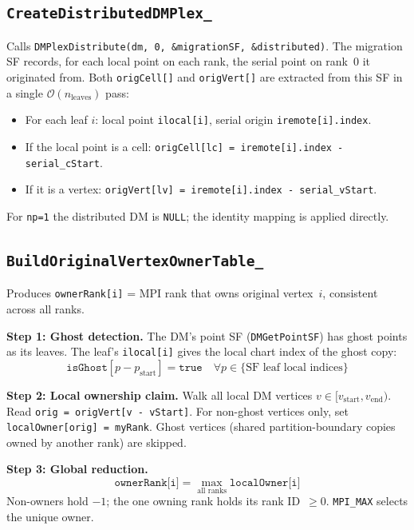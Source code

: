 \documentclass[11pt]{article}
\begin{document}
\subsection{\texttt{CreateDistributedDMPlex\_}}
\label{sec:createdist}

Calls \texttt{DMPlexDistribute(dm, 0, \&migrationSF, \&distributed)}.
The migration SF records, for each local point on each rank, the serial point on
rank~0 it originated from.  Both \texttt{origCell[]} and \texttt{origVert[]} are
extracted from this SF in a single $\mathcal{O}(n_\text{leaves})$ pass:
\begin{itemize}
  \item For each leaf $i$: local point \texttt{ilocal[i]}, serial origin \texttt{iremote[i].index}.
  \item If the local point is a cell: \texttt{origCell[lc] = iremote[i].index - serial\_cStart}.
  \item If it is a vertex: \texttt{origVert[lv] = iremote[i].index - serial\_vStart}.
\end{itemize}
For \texttt{np=1} the distributed DM is \texttt{NULL}; the identity mapping is applied directly.

\subsection{\texttt{BuildOriginalVertexOwnerTable\_}}
\label{sec:owner}

Produces \texttt{ownerRank[i]} = MPI rank that owns original vertex~$i$,
consistent across all ranks.

\textbf{Step 1: Ghost detection.}
The DM's point SF (\texttt{DMGetPointSF}) has ghost points as its leaves.
The leaf's \texttt{ilocal[i]} gives the local chart index of the ghost copy:
\[
  \texttt{isGhost}[p - p_\text{start}] = \texttt{true}
  \quad \forall p \in \{\text{SF leaf local indices}\}
\]

\textbf{Step 2: Local ownership claim.}
Walk all local DM vertices $v \in [v_\text{start}, v_\text{end})$.  Read
\texttt{orig = origVert[v - vStart]}.  For non-ghost vertices only, set
\texttt{localOwner[orig] = myRank}.  Ghost vertices (shared partition-boundary
copies owned by another rank) are skipped.

\textbf{Step 3: Global reduction.}
\[
  \texttt{ownerRank[i]} = \max_{\text{all ranks}} \texttt{localOwner[i]}
\]
Non-owners hold $-1$; the one owning rank holds its rank ID~$\geq 0$.
\texttt{MPI\_MAX} selects the unique owner.
\end{document}
